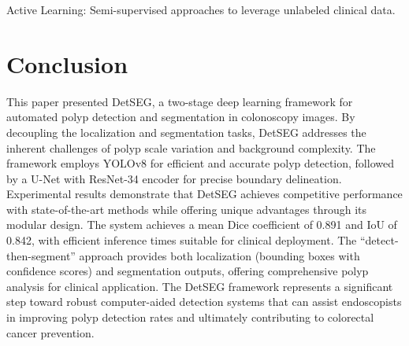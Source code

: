 \documentclass[runningheads]{llncs}
\begin{document}
\noindent Active Learning: Semi-supervised approaches to leverage unlabeled clinical data.

\section{Conclusion}

This paper presented DetSEG, a two-stage deep learning framework for automated polyp detection and segmentation in colonoscopy images. By decoupling the localization and segmentation tasks, DetSEG addresses the inherent challenges of polyp scale variation and background complexity. The framework employs YOLOv8 for efficient and accurate polyp detection, followed by a U-Net with ResNet-34 encoder for precise boundary delineation. Experimental results demonstrate that DetSEG achieves competitive performance with state-of-the-art methods while offering unique advantages through its modular design. The system achieves a mean Dice coefficient of 0.891 and IoU of 0.842, with efficient inference times suitable for clinical deployment. The ``detect-then-segment'' approach provides both localization (bounding boxes with confidence scores) and segmentation outputs, offering comprehensive polyp analysis for clinical application. The DetSEG framework represents a significant step toward robust computer-aided detection systems that can assist endoscopists in improving polyp detection rates and ultimately contributing to colorectal cancer prevention.
\end{document}

